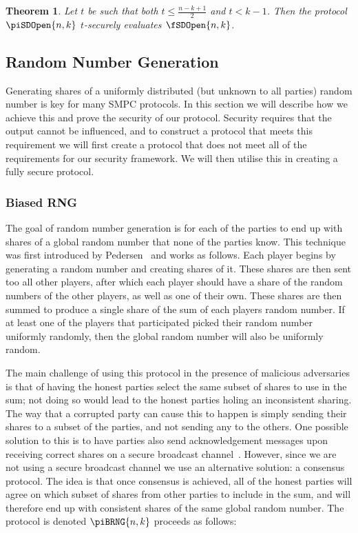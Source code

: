 \documentclass{article}
\newtheorem{theorem}{Theorem}
\theoremstyle{remark}
\begin{document}
\begin{theorem}
	Let $t$ be such that both $t \le \frac{n - k + 1}{2}$ and $t < k - 1$. Then
	the protocol $\piSDOpen{n,k}$ $t$-securely evaluates $\fSDOpen{n,k}$.
\end{theorem}

\subsection{Random Number Generation}\label{sec:rng}

Generating shares of a uniformly distributed (but unknown to all parties)
random number is key for many SMPC protocols. In this section we will describe
how we achieve this and prove the security of our protocol. Security requires
that the output cannot be influenced, and to construct a protocol that meets
this requirement we will first create a protocol that does not meet all of the
requirements for our security framework. We will then utilise this in creating
a fully secure protocol.

\subsubsection{Biased RNG}

The goal of random number generation is for each of the parties to end up with
shares of a global random number that none of the parties know. This technique
was first introduced by Pedersen~\cite{p91a} and works as follows. Each player
begins by generating a random number and creating shares of it. These shares
are then sent too all other players, after which each player should have a
share of the random numbers of the other players, as well as one of their own.
These shares are then summed to produce a single share of the sum of each
players random number. If at least one of the players that participated picked
their random number uniformly randomly, then the global random number will also
be uniformly random.

The main challenge of using this protocol in the presence of malicious
adversaries is that of having the honest parties select the same subset of
shares to use in the sum; not doing so would lead to the honest parties holing
an inconsistent sharing. The way that a corrupted party can cause this to
happen is simply sending their shares to a subset of the parties, and not
sending any to the others. One possible solution to this is to have parties
also send acknowledgement messages upon receiving correct shares on a secure
broadcast channel~\cite{gjkr96}. However, since we are not using a secure
broadcast channel we use an alternative solution: a consensus protocol. The
idea is that once consensus is achieved, all of the honest parties will agree
on which subset of shares from other parties to include in the sum, and will
therefore end up with consistent shares of the same global random number. The
protocol is denoted $\piBRNG{n,k}$ proceeds as follows:
\end{document}

